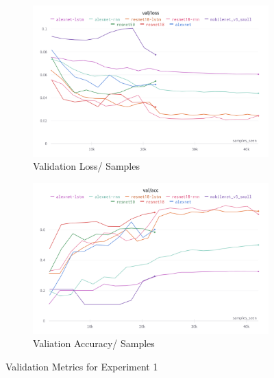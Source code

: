 \documentclass[a4paper]{article}
\begin{document}
  \begin{figure}[ht]
    \centering
    \begin{subfigure}[b]{0.49\linewidth}
      \centering
      \includegraphics[width=\linewidth]{figures/experiment1-val-loss.png}
      \caption{Validation Loss/ Samples}
      \label{fig:experiment1-val-acc}
    \end{subfigure}
    \hfill
    \begin{subfigure}[b]{0.49\linewidth}
      \centering
      \includegraphics[width=\linewidth]{figures/experiment1-val-acc.png}
      \caption{Valiation Accuracy/ Samples}
      \label{fig:experiment1-val-loss}
    \end{subfigure}
    \caption{Validation Metrics for Experiment 1}
    \label{fig:experiment-1-validation}
  \end{figure}

  
\end{document}
